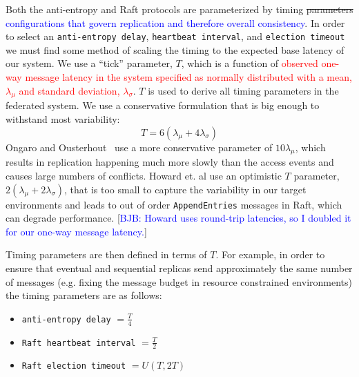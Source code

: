 \documentclass[10pt,conference,letterpaper]{IEEEtran}
\newcommand{\blue}[1]{{\textcolor{blue}{#1}}}
\newcommand{\bjb}[1]{[\blue{BJB: #1}]}
\newcommand{\red}[1]{\textcolor{red}{#1}}
\begin{document}
Both the anti-entropy and Raft protocols are parameterized by timing \st{parameters} \blue{configurations that govern replication and therefore overall consistency}.
In order to select an \texttt{anti-entropy delay}, \texttt{heartbeat
interval}, and \texttt{election timeout} we must find some method of
scaling the timing to the expected base latency of our system.
We use a ``tick'' parameter, $T$, which is a function of
\red{observed one-way message latency in the system specified as normally
distributed with a mean, $\lambda_{\mu}$ and standard deviation,
$\lambda_{\sigma}$}.
$T$ is used to derive all timing parameters in the federated system.
We use a conservative formulation that is
big enough to withstand most variability:
\begin{equation}
    T = 6(\lambda_{\mu} + 4\lambda_{\sigma})
\end{equation}
Ongaro and Ousterhout~\cite{ongaro_search_2014} use a more conservative
parameter of $10\lambda_{\mu}$, which results in replication happening much
more slowly than the access events and causes large numbers of conflicts.
Howard et.
al \cite{howard_raft_2015} use an
optimistic $T$ parameter, $2\left(\lambda_{\mu} + 2\lambda_{\sigma}\right)$, that is too small to capture
the variability in our target environments and leads to out of order
\texttt{AppendEntries} messages in Raft, which can degrade performance. \bjb{Howard uses round-trip latencies, so I doubled it for our one-way message latency.}

Timing parameters are then defined in terms of $T$.
For example, in order to ensure that eventual and sequential replicas send approximately
the same number of messages (e.g.
fixing the message budget in resource constrained environments) the timing
parameters are as follows:
\begin{itemize}
    \item \texttt{anti-entropy delay} $= \frac{T}{4}$
    \item \texttt{Raft heartbeat interval} $= \frac{T}{2}$
    \item \texttt{Raft election timeout} $= U(T, 2T)$
\end{itemize}

\end{document}
